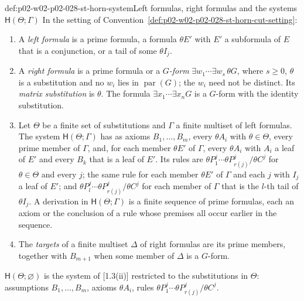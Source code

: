 \begin{hbdefinition}{def:p02-w02-p02-028-st-horn-system}{Left formulas, right formulas and the systems \(\mathsf H(\Theta;\Gamma)\)}
In the setting of
Convention~\ref{def:p02-w02-p02-028-st-horn-cut-setting}:
\begin{enumerate}
  \item A \emph{left formula} is a prime formula, a formula \(\theta E'\)
        with \(E'\) a subformula of \(E\) that is a conjunction, or a tail of
        some \(\theta I_j\).
  \item A \emph{right formula} is a prime formula or a \emph{\(G\)-form}
        \(\exists w_1\cdots\exists w_s\,\theta G\), where \(s\geq0\),
        \(\theta\) is a substitution and no \(w_i\) lies in
        \(\operatorname{par}(G)\); the \(w_i\) need not be distinct.  Its
        \emph{matrix substitution} is \(\theta\).  The formula
        \(\exists x_1\cdots\exists x_nG\) is a \(G\)-form with the identity
        substitution.
  \item Let \(\Theta\) be a finite set of substitutions and \(\Gamma\) a
        finite multiset of left formulas.  The system
        \(\mathsf H(\Theta;\Gamma)\) has as axioms \(B_1,\ldots,B_m\), every
        \(\theta A_i\) with \(\theta\in\Theta\), every prime member of
        \(\Gamma\), and, for each member \(\theta E'\) of \(\Gamma\), every
        \(\theta A_i\) with \(A_i\) a leaf of \(E'\) and every \(B_k\) that is
        a leaf of \(E'\).  Its rules
        are
        \(\theta P^j_1\cdots\theta P^j_{r(j)}/\theta C^j\) for
        \(\theta\in\Theta\) and every \(j\); the same rule for each member
        \(\theta E'\) of \(\Gamma\) and each \(j\) with \(I_j\) a leaf of
        \(E'\); and
        \(\theta P^j_l\cdots\theta P^j_{r(j)}/\theta C^j\) for each member of
        \(\Gamma\) that is the \(l\)-th tail of \(\theta I_j\).  A
        derivation in \(\mathsf H(\Theta;\Gamma)\) is a finite sequence of
        prime formulas, each an axiom or the conclusion of a rule whose
        premises all occur earlier in the sequence.
  \item The \emph{targets} of a finite multiset \(\Delta\) of right formulas
        are its prime members, together with \(B_{m+1}\) when some member of
        \(\Delta\) is a \(G\)-form.
\end{enumerate}
\(\mathsf H(\Theta;\varnothing)\) is the system of [1.3(ii)] restricted to
the substitutions in \(\Theta\): assumptions \(B_1,\ldots,B_m\), axioms
\(\theta A_i\), rules \(\theta P^j_1\cdots\theta P^j_{r(j)}/\theta C^j\).
\end{hbdefinition}

